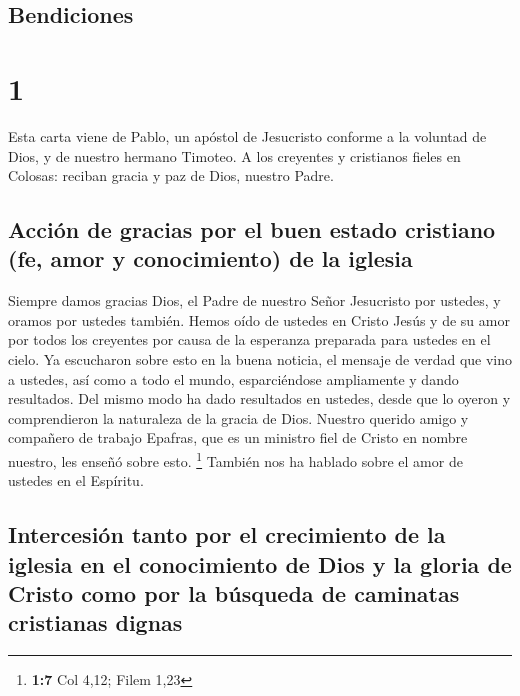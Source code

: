 \hypertarget{bendiciones}{%
\subsection{Bendiciones}\label{bendiciones}}

\hypertarget{section}{%
\section{1}\label{section}}

 Esta carta viene de Pablo, un apóstol de Jesucristo
conforme a la voluntad de Dios, y de nuestro hermano Timoteo.
 A los creyentes y cristianos fieles en Colosas: reciban
gracia y paz de Dios, nuestro Padre.

\hypertarget{acciuxf3n-de-gracias-por-el-buen-estado-cristiano-fe-amor-y-conocimiento-de-la-iglesia}{%
\subsection{Acción de gracias por el buen estado cristiano (fe, amor y
conocimiento) de la
iglesia}\label{acciuxf3n-de-gracias-por-el-buen-estado-cristiano-fe-amor-y-conocimiento-de-la-iglesia}}

 Siempre damos gracias Dios, el Padre de nuestro Señor
Jesucristo por ustedes, y oramos por ustedes también. 
Hemos oído de ustedes en Cristo Jesús y de su amor por todos los
creyentes  por causa de la esperanza preparada para
ustedes en el cielo. Ya escucharon sobre esto en la buena noticia, el
mensaje de verdad  que vino a ustedes, así como a todo el
mundo, esparciéndose ampliamente y dando resultados. Del mismo modo ha
dado resultados en ustedes, desde que lo oyeron y comprendieron la
naturaleza de la gracia de Dios.  Nuestro querido amigo y
compañero de trabajo Epafras, que es un ministro fiel de Cristo en
nombre nuestro, les enseñó sobre esto. \footnote{\textbf{1:7} Col 4,12;
  Filem 1,23}  También nos ha hablado sobre el amor de
ustedes en el Espíritu.

\hypertarget{intercesiuxf3n-tanto-por-el-crecimiento-de-la-iglesia-en-el-conocimiento-de-dios-y-la-gloria-de-cristo-como-por-la-buxfasqueda-de-caminatas-cristianas-dignas}{%
\subsection{Intercesión tanto por el crecimiento de la iglesia en el
conocimiento de Dios y la gloria de Cristo como por la búsqueda de
caminatas cristianas
dignas}\label{intercesiuxf3n-tanto-por-el-crecimiento-de-la-iglesia-en-el-conocimiento-de-dios-y-la-gloria-de-cristo-como-por-la-buxfasqueda-de-caminatas-cristianas-dignas}}


